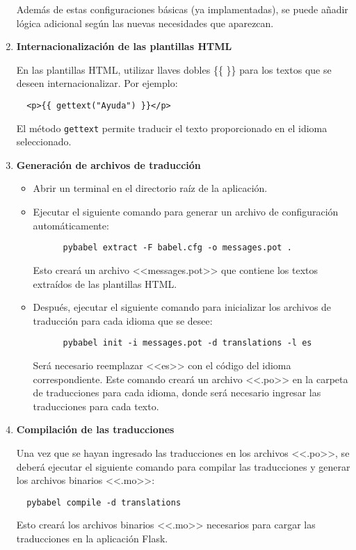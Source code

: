 \begin{enumerate}
  Además de estas configuraciones básicas (ya implamentadas), se puede añadir lógica adicional según las nuevas necesidades que aparezcan.

  \item \textbf{Internacionalización de las plantillas HTML}

  En las plantillas HTML, utilizar llaves dobles \{\{ \}\} para los textos que se deseen internacionalizar. Por ejemplo:
  \begin{verbatim}
  <p>{{ gettext("Ayuda") }}</p>
  \end{verbatim}

  El método \texttt{gettext} permite traducir el texto proporcionado en el idioma seleccionado.

  \item \textbf{Generación de archivos de traducción}

  \begin{itemize}
    \item Abrir un terminal en el directorio raíz de la aplicación.
    \item Ejecutar el siguiente comando para generar un archivo de configuración automáticamente:
      \begin{verbatim}
      pybabel extract -F babel.cfg -o messages.pot .
      \end{verbatim}
      Esto creará un archivo <<messages.pot>> que contiene los textos extraídos de las plantillas HTML.

    \item Después, ejecutar el siguiente comando para inicializar los archivos de traducción para cada idioma que se desee:
      \begin{verbatim}
      pybabel init -i messages.pot -d translations -l es
      \end{verbatim}
      Será necesario reemplazar <<es>> con el código del idioma correspondiente. Este comando creará un archivo <<.po>> en la carpeta de traducciones para cada idioma, donde será necesario ingresar las traducciones para cada texto.
  \end{itemize}

  \item \textbf{Compilación de las traducciones}

  Una vez que se hayan ingresado las traducciones en los archivos <<.po>>, se deberá ejecutar el siguiente comando para compilar las traducciones y generar los archivos binarios <<.mo>>:
  \begin{verbatim}
  pybabel compile -d translations
  \end{verbatim}
  Esto creará los archivos binarios <<.mo>> necesarios para cargar las traducciones en la aplicación Flask.
\end{enumerate}

